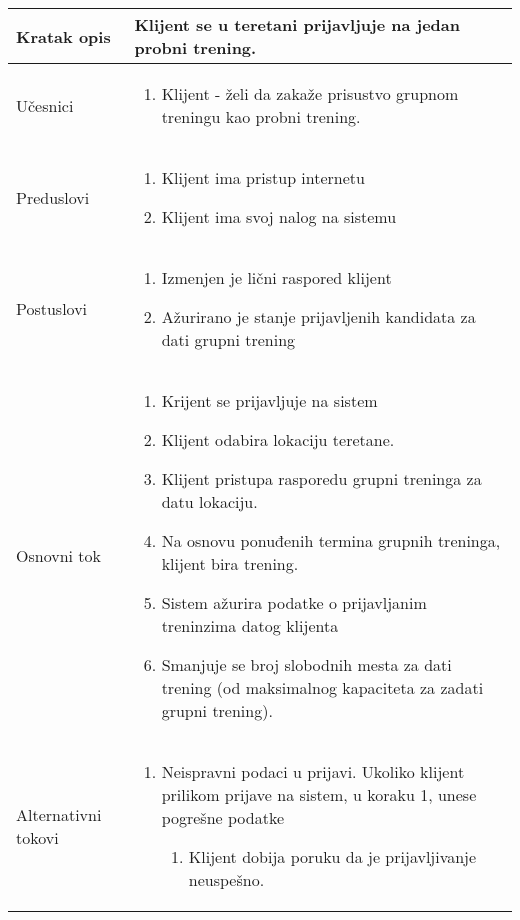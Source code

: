 \documentclass[../grupniTreninzi.tex]{subfiles}
\begin{document}
\begin{longtable}{| p{} | p{} |} 
\hline
    Kratak opis &  Klijent se u teretani prijavljuje na jedan probni trening.\\ 
\hline    
    Učesnici &
    \begin{enumerate}
        \item Klijent - želi da zakaže prisustvo grupnom treningu kao probni trening.
    \end{enumerate}\\
\hline
   Preduslovi & 
   \begin{enumerate}
        \item Klijent ima pristup internetu
        \item Klijent ima svoj nalog na sistemu
    \end{enumerate}\\
\hline  
    Postuslovi &
    \begin{enumerate}
        \item Izmenjen je lični raspored klijent
        \item Ažurirano je stanje prijavljenih kandidata za dati grupni trening
    \end{enumerate}\\
\hline
    Osnovni tok & 
    \begin{enumerate}
        \item Krijent se prijavljuje na sistem
        \item Klijent odabira lokaciju teretane.
        \item Klijent pristupa rasporedu grupni treninga za datu lokaciju.
        \item Na osnovu ponuđenih termina grupnih treninga, klijent bira trening.
        \item Sistem ažurira podatke o prijavljanim treninzima datog klijenta
        \item Smanjuje se broj slobodnih mesta za dati trening (od maksimalnog kapaciteta za zadati grupni trening).
    \end{enumerate}\\
\hline
    Alternativni tokovi & 
       \begin{enumerate}
        \item Neispravni podaci u prijavi. Ukoliko klijent prilikom prijave na sistem, u koraku 1, unese pogrešne podatke
            \begin{enumerate}
                \item Klijent dobija poruku da je prijavljivanje neuspešno.

\end{enumerate}
\end{enumerate}
\end{longtable}
\end{document}
